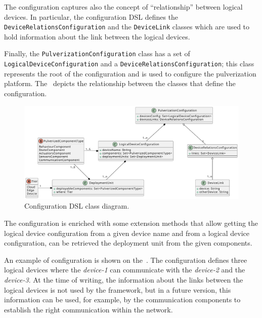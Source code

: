 The configuration captures also the concept of ``relationship'' between logical devices. In particular, the configuration DSL defines
the \texttt{Device\-Relations\-Configuration} and the \texttt{DeviceLink} classes which are used to hold information about the link between the logical devices.

Finally, the \texttt{PulverizationConfiguration} class has a set of \texttt{Logical\-Device\-Configuration} and a
\texttt{DeviceRelationsConfiguration}; this class represents the root of the configuration and is used to configure the pulverization platform.
The~ depicts the relationship between the classes that define the configuration.

\begin{figure}
	\centering
	\includegraphics[width=\textwidth]{figures/config-dsl-class.pdf}
	\caption{Configuration DSL class diagram.}
	\label{fig:configuration-dsl-classes}
\end{figure}

The configuration is enriched with some extension methods that allow getting the logical device configuration from a given device name and
from a logical device configuration, can be retrieved the deployment unit from the given components.



An example of configuration is shown on the~. The configuration defines three logical devices where the
\emph{device-1} can communicate with the \emph{device-2} and the \emph{device-3}. At the time of writing, the information about the links
between the logical devices is not used by the framework, but in a future version, this information can be used, for example, by the communication
components to establish the right communication within the network.

